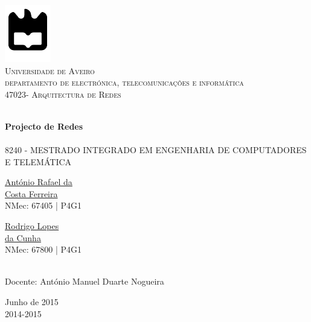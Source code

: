 \begin{titlepage}

\begin{center}

\includegraphics[width=0.15\textwidth]{./logo}\\[0.5cm]    

\textsc{\large Universidade de Aveiro \\[1cm]\large departamento de electrónica, telecomunicações e informática}\\[1cm]

\textsc{\large{47023}\large - Arquitectura de Redes \\[1cm]}

\HRule \\[0.5cm]
{ \large \bfseries Projecto de Redes}\\[0.4cm]
\HRule \\[1cm]

\textsc{\small{8240 - MESTRADO INTEGRADO EM ENGENHARIA DE COMPUTADORES E TELEMÁTICA}}\\[1cm]

\begin{minipage}{0.4\textwidth}

\begin{flushleft} \large
\href{mailto:rafael.ferreira@ua.pt}{António Rafael da \\ Costa Ferreira }
 \small{\\NMec: 67405 | P4G1}
\end{flushleft}
\end{minipage}
\begin{minipage}{0.4\textwidth}

\begin{flushright} \large
\href{mailto:rodrigocunha@ua.pt}{Rodrigo Lopes \\ da Cunha}
\small{\\NMec: 67800 | P4G1}
\end{flushright}
\end{minipage}\\[1cm]

{\large Docente: António Manuel Duarte Nogueira  }\\[0.5cm]

\vfill

{\large Junho de 2015 \\ 2014-2015}

\end{center}

\end{titlepage}